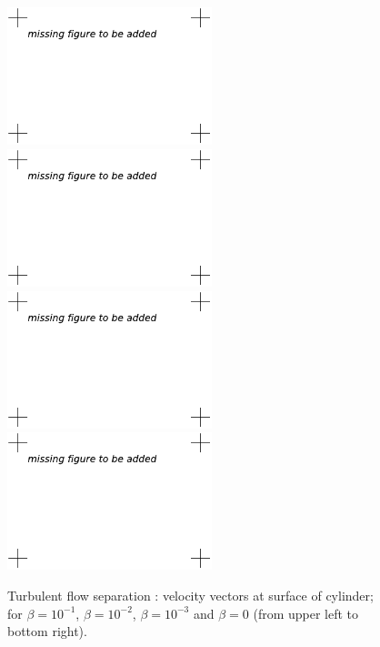 \begin{figure}
\centering
\includegraphics[height=4cm]{chapters/hoffman-1/pdf/Hoffman_fig2a.pdf}
\includegraphics[height=4cm]{chapters/hoffman-1/pdf/Hoffman_fig2b.pdf}
\includegraphics[height=4cm]{chapters/hoffman-1/pdf/Hoffman_fig2c.pdf}
\includegraphics[height=4cm]{chapters/hoffman-1/pdf/Hoffman_fig2d.pdf}
\caption{Turbulent flow separation  \cite{JanssonHoffman2009}: velocity vectors at surface of cylinder; for $\beta = 10^{-1}$, $\beta = 10^{-2}$, $\beta = 10^{-3}$ and $\beta = 0$ (from upper left to bottom right).}
\label{fig:1}
\end{figure}

